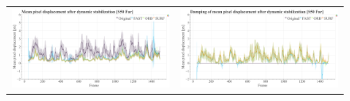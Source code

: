 \begin{figure}[!ht]
\begin{tabular}{cc}
      \includegraphics[width=0.475\linewidth]{diagrams/optical_flow/s50_s_far_image_raw.mp4.csv/compare_of_mean_pixel_displacement/window_size_12.html.png}    & 
      \includegraphics[width=0.475\linewidth]{diagrams/optical_flow/s50_s_far_image_raw.mp4.csv/deltas_of_mean_pixel_displacement/window_size_12.html.png}   \\ 


\end{tabular}
\end{figure}
